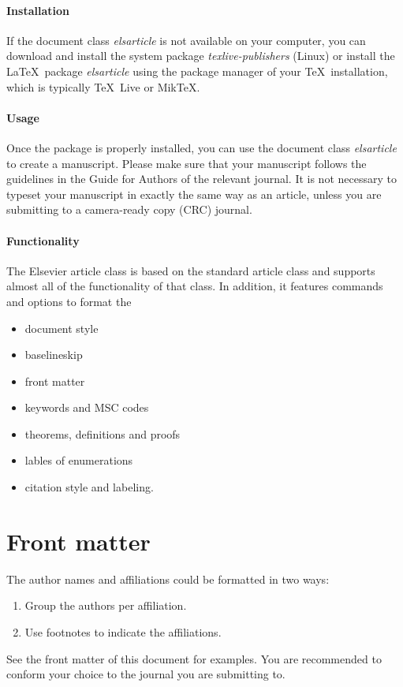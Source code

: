\documentclass[review]{elsarticle}
\begin{document}
\paragraph{Installation} If the document class \emph{elsarticle} is not available on your computer, you can download and install the system package \emph{texlive-publishers} (Linux) or install the \LaTeX\ package \emph{elsarticle} using the package manager of your \TeX\ installation, which is typically \TeX\ Live or Mik\TeX.

\paragraph{Usage} Once the package is properly installed, you can use the document class \emph{elsarticle} to create a manuscript. Please make sure that your manuscript follows the guidelines in the Guide for Authors of the relevant journal. It is not necessary to typeset your manuscript in exactly the same way as an article, unless you are submitting to a camera-ready copy (CRC) journal.

\paragraph{Functionality} The Elsevier article class is based on the standard article class and supports almost all of the functionality of that class. In addition, it features commands and options to format the
\begin{itemize}
\item document style
\item baselineskip
\item front matter
\item keywords and MSC codes
\item theorems, definitions and proofs
\item lables of enumerations
\item citation style and labeling.
\end{itemize}

\section{Front matter}

The author names and affiliations could be formatted in two ways:
\begin{enumerate}[(1)]
\item Group the authors per affiliation.
\item Use footnotes to indicate the affiliations.
\end{enumerate}
See the front matter of this document for examples. You are recommended to conform your choice to the journal you are submitting to.
\end{document}
